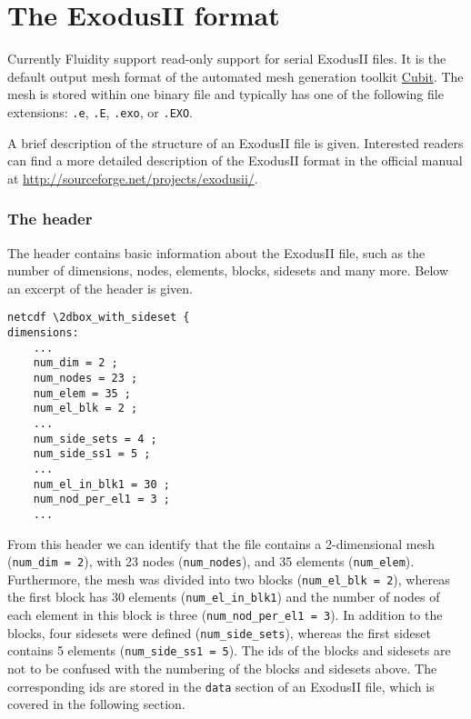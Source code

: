 \section{The ExodusII format}
\label{sec:exodusii_format}

Currently Fluidity support read-only support for serial ExodusII files. It is the default 
output mesh format of the automated mesh generation toolkit \href{http://cubit.sandia.gov/}{Cubit}.
The mesh is stored within one binary file and typically has one of the following file extensions: 
\texttt{.e}, \texttt{.E}, \texttt{.exo}, or \texttt{.EXO}.

A brief description of the structure of an ExodusII file is given. Interested readers can find a 
more detailed description of the ExodusII format in the official manual at 
\url{http://sourceforge.net/projects/exodusii/}.

\subsubsection*{The header}
\label{ssec:exodusii_header_section}

The header contains basic information about the ExodusII file, such as the number of dimensions, 
nodes, elements, blocks, sidesets and many more. Below an excerpt of the header is given.
\begin{lstlisting}
netcdf \2dbox_with_sideset {
dimensions:
    ...
    num_dim = 2 ;
    num_nodes = 23 ;
    num_elem = 35 ;
    num_el_blk = 2 ;
    ...
    num_side_sets = 4 ;
    num_side_ss1 = 5 ;
    ...
    num_el_in_blk1 = 30 ;
    num_nod_per_el1 = 3 ;
    ...
\end{lstlisting}

From this header we can identify that the file contains a 2-dimensional 
mesh (\texttt{num\_dim = 2}), with 23 nodes (\texttt{num\_nodes}), and 
35 elements (\texttt{num\_elem}). Furthermore, the mesh was divided into 
two blocks (\texttt{num\_el\_blk = 2}), whereas the first block has 
30 elements (\texttt{num\_el\_in\_blk1}) and the number of nodes of each 
element in this block is three (\texttt{num\_nod\_per\_el1 = 3}). In addition 
to the blocks, four sidesets were defined (\texttt{num\_side\_sets}), 
whereas the first sideset contains 5 elements (\texttt{num\_side\_ss1 = 5}).
The ids of the blocks and sidesets are not to be confused with the numbering 
of the blocks and sidesets above. The corresponding ids are stored in the 
\texttt{data} section of an ExodusII file, which is covered in the following 
section.

